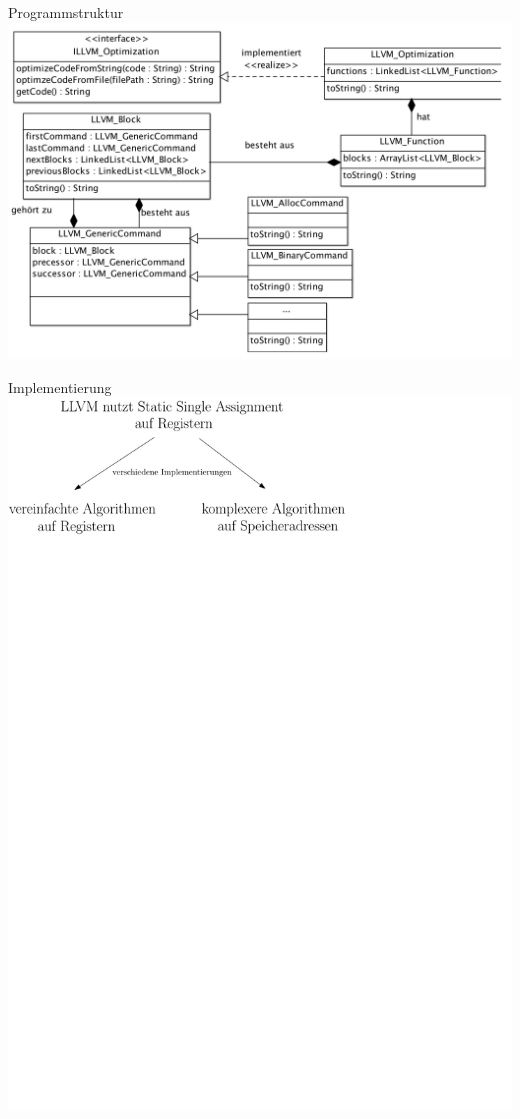 \documentclass[ucs,9pt]{beamer}
\begin{document}
\begin{frame}{Programmstruktur}
	\includegraphics[scale=0.62]{bilder/klassendiagramm.png}
\end{frame}

\begin{frame}{Implementierung}
\includegraphics[scale=0.8]{bilder/ssa}
\end{frame}
\end{document}
